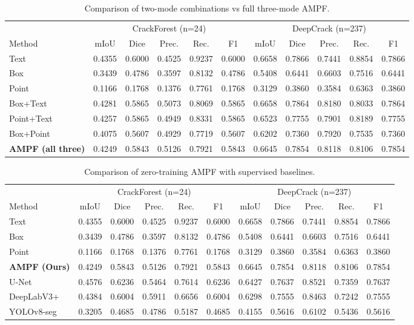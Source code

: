 \begin{table}[htbp]
\centering
\caption{Comparison of two-mode combinations vs full three-mode AMPF.}
\label{tab:mode_combinations}
\begin{tabular}{l|ccccc|ccccc}
\hline
& \multicolumn{5}{c|}{CrackForest (n=24)} & \multicolumn{5}{c}{DeepCrack (n=237)} \\
Method & mIoU & Dice & Prec. & Rec. & F1 & mIoU & Dice & Prec. & Rec. & F1 \\
\hline
Text & 0.4355 & 0.6000 & 0.4525 & 0.9237 & 0.6000 & 0.6658 & 0.7866 & 0.7441 & 0.8854 & 0.7866 \\
Box & 0.3439 & 0.4786 & 0.3597 & 0.8132 & 0.4786 & 0.5408 & 0.6441 & 0.6603 & 0.7516 & 0.6441 \\
Point & 0.1166 & 0.1768 & 0.1376 & 0.7761 & 0.1768 & 0.3129 & 0.3860 & 0.3584 & 0.6363 & 0.3860 \\
Box+Text & 0.4281 & 0.5865 & 0.5073 & 0.8069 & 0.5865 & 0.6658 & 0.7864 & 0.8180 & 0.8033 & 0.7864 \\
Point+Text & 0.4257 & 0.5865 & 0.4949 & 0.8331 & 0.5865 & 0.6523 & 0.7755 & 0.7901 & 0.8189 & 0.7755 \\
Box+Point & 0.4075 & 0.5607 & 0.4929 & 0.7719 & 0.5607 & 0.6202 & 0.7360 & 0.7920 & 0.7535 & 0.7360 \\
\textbf{AMPF (all three)} & 0.4249 & 0.5843 & 0.5126 & 0.7921 & 0.5843 & 0.6645 & 0.7854 & 0.8118 & 0.8106 & 0.7854 \\
\hline
\end{tabular}
\end{table}

\begin{table}[htbp]
\centering
\caption{Comparison of zero-training AMPF with supervised baselines.}
\label{tab:supervised_comparison}
\begin{tabular}{l|ccccc|ccccc}
\hline
& \multicolumn{5}{c|}{CrackForest (n=24)} & \multicolumn{5}{c}{DeepCrack (n=237)} \\
Method & mIoU & Dice & Prec. & Rec. & F1 & mIoU & Dice & Prec. & Rec. & F1 \\
\hline
Text & 0.4355 & 0.6000 & 0.4525 & 0.9237 & 0.6000 & 0.6658 & 0.7866 & 0.7441 & 0.8854 & 0.7866 \\
Box & 0.3439 & 0.4786 & 0.3597 & 0.8132 & 0.4786 & 0.5408 & 0.6441 & 0.6603 & 0.7516 & 0.6441 \\
Point & 0.1166 & 0.1768 & 0.1376 & 0.7761 & 0.1768 & 0.3129 & 0.3860 & 0.3584 & 0.6363 & 0.3860 \\
\textbf{AMPF (Ours)} & 0.4249 & 0.5843 & 0.5126 & 0.7921 & 0.5843 & 0.6645 & 0.7854 & 0.8118 & 0.8106 & 0.7854 \\
U-Net & 0.4576 & 0.6236 & 0.5464 & 0.7614 & 0.6236 & 0.6427 & 0.7637 & 0.8521 & 0.7359 & 0.7637 \\
DeepLabV3+ & 0.4384 & 0.6004 & 0.5911 & 0.6656 & 0.6004 & 0.6298 & 0.7555 & 0.8463 & 0.7242 & 0.7555 \\
YOLOv8-seg & 0.3205 & 0.4685 & 0.4786 & 0.5187 & 0.4685 & 0.4155 & 0.5616 & 0.6102 & 0.5436 & 0.5616 \\
\hline
\end{tabular}
\end{table}
